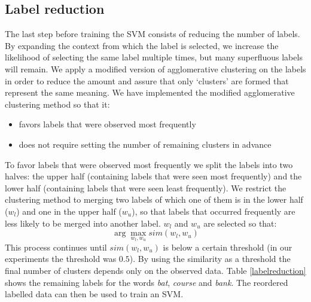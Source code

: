 \documentclass[11pt]{article}
\begin{document}
\subsection{Label reduction}
The last step before training the SVM consists of reducing the number of labels. By expanding the context from which the label is selected, we increase the likelihood of selecting the same label multiple times, but many superfluous labels will remain. We apply a modified version of agglomerative clustering on the labels in order to reduce the amount and assure that only `clusters' are formed that represent the same meaning. We have implemented the modified agglomerative clustering method so that it:
\begin{itemize}
\item favors labels that were observed most frequently
\item does not require setting the number of remaining clusters in advance
\end{itemize}
To favor labels that were observed most frequently we split the labels into two halves: the upper half (containing labels that were seen most frequently) and the lower half (containing labels that were seen least frequently). We restrict the clustering method to merging two labels of which one of them is  in the lower half ($w_l$) and one in the upper half ($w_u$), so that labels that occurred frequently are less likely to be merged into another label. $w_l$ and $w_u$ are selected so that: 
$$\arg\max_{w_l, w_u} \textit{sim}(w_l, w_u)$$
This process continues until $\textit{sim}(w_l, w_u)$ is below a certain threshold (in our experiments the threshold was $0.5$). By using the similarity as a threshold the final number of clusters depends only on the observed data. Table \ref{labelreduction} shows the remaining labels for the words \textit{bat}, \textit{course} and \textit{bank}.
The reordered labelled data can then be used to train an SVM.
\end{document}
